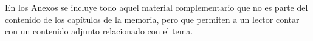 
En los Anexos se incluye todo aquel material complementario que no es parte del contenido de los capítulos de la memoria, pero que permiten a un lector contar con un contenido adjunto relacionado con el tema.
